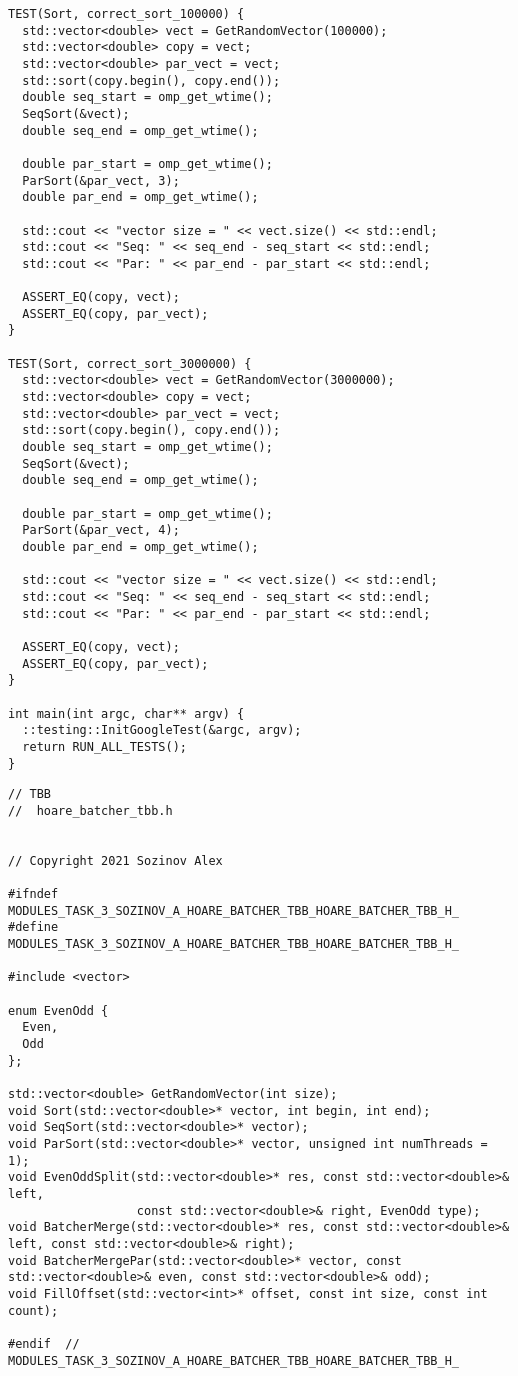 \documentclass{report}
\begin{document}
\begin{lstlisting}
TEST(Sort, correct_sort_100000) {
  std::vector<double> vect = GetRandomVector(100000);
  std::vector<double> copy = vect;
  std::vector<double> par_vect = vect;
  std::sort(copy.begin(), copy.end());
  double seq_start = omp_get_wtime();
  SeqSort(&vect);
  double seq_end = omp_get_wtime();

  double par_start = omp_get_wtime();
  ParSort(&par_vect, 3);
  double par_end = omp_get_wtime();

  std::cout << "vector size = " << vect.size() << std::endl;
  std::cout << "Seq: " << seq_end - seq_start << std::endl;
  std::cout << "Par: " << par_end - par_start << std::endl;

  ASSERT_EQ(copy, vect);
  ASSERT_EQ(copy, par_vect);
}

TEST(Sort, correct_sort_3000000) {
  std::vector<double> vect = GetRandomVector(3000000);
  std::vector<double> copy = vect;
  std::vector<double> par_vect = vect;
  std::sort(copy.begin(), copy.end());
  double seq_start = omp_get_wtime();
  SeqSort(&vect);
  double seq_end = omp_get_wtime();

  double par_start = omp_get_wtime();
  ParSort(&par_vect, 4);
  double par_end = omp_get_wtime();

  std::cout << "vector size = " << vect.size() << std::endl;
  std::cout << "Seq: " << seq_end - seq_start << std::endl;
  std::cout << "Par: " << par_end - par_start << std::endl;

  ASSERT_EQ(copy, vect);
  ASSERT_EQ(copy, par_vect);
}

int main(int argc, char** argv) {
  ::testing::InitGoogleTest(&argc, argv);
  return RUN_ALL_TESTS();
}

\end{lstlisting}

\begin{lstlisting}
// TBB
//  hoare_batcher_tbb.h


// Copyright 2021 Sozinov Alex

#ifndef MODULES_TASK_3_SOZINOV_A_HOARE_BATCHER_TBB_HOARE_BATCHER_TBB_H_
#define MODULES_TASK_3_SOZINOV_A_HOARE_BATCHER_TBB_HOARE_BATCHER_TBB_H_

#include <vector>

enum EvenOdd {
  Even,
  Odd
};

std::vector<double> GetRandomVector(int size);
void Sort(std::vector<double>* vector, int begin, int end);
void SeqSort(std::vector<double>* vector);
void ParSort(std::vector<double>* vector, unsigned int numThreads = 1);
void EvenOddSplit(std::vector<double>* res, const std::vector<double>& left,
                  const std::vector<double>& right, EvenOdd type);
void BatcherMerge(std::vector<double>* res, const std::vector<double>& left, const std::vector<double>& right);
void BatcherMergePar(std::vector<double>* vector, const std::vector<double>& even, const std::vector<double>& odd);
void FillOffset(std::vector<int>* offset, const int size, const int count);

#endif  // MODULES_TASK_3_SOZINOV_A_HOARE_BATCHER_TBB_HOARE_BATCHER_TBB_H_

\end{lstlisting}
\end{document}
